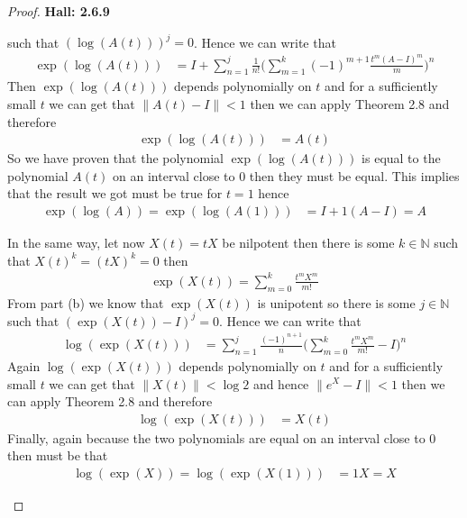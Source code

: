 \documentclass[11pt]{article}
\newcommand{\N}{\mathbb{N}}
\theoremstyle{definition}
\begin{document}
\begin{proof}{\textbf{Hall: 2.6.9}}
\begin{itemize}
such that $(\log(A(t)))^j = 0$. Hence we can write that
\begin{align*}
    \exp(\log(A(t)))
    &= I + \sum_{n=1}^j\frac{1}{n!}
    \bigg(\sum_{m=1}^k (-1)^{m+1}\frac{t^m(A - I)^m}{m}\bigg)^n
\end{align*}
Then $\exp(\log(A(t)))$ depends polynomially on $t$ and for a sufficiently
small $t$ we can get that $\|A(t) - I\| < 1$ then we can apply Theorem 2.8
and therefore
\begin{align*}
    \exp(\log(A(t))) &= A(t)
\end{align*}
So we have proven that the polynomial $\exp(\log(A(t)))$ is equal to the
polynomial $A(t)$ on an interval close to 0 then they must be equal. This
implies that the result we got must be true for $t=1$ hence
\begin{align*}
    \exp(\log(A)) = \exp(\log(A(1))) &= I + 1(A -I) = A
\end{align*}


In the same way, let now $X(t) = tX$ be nilpotent then there is some
$k \in \N$ such that $X(t)^k = (tX)^k = 0$ then 
\begin{align*}
    \exp(X(t)) = \sum_{m=0}^k \frac{t^mX^m}{m!}
\end{align*}
From part (b) we know that $\exp(X(t))$ is unipotent so there is some $j \in \N$
such that $(\exp(X(t)) - I)^j = 0$. Hence we can write that
\begin{align*}
    \log(\exp(X(t)))
    &= \sum_{n=1}^j\frac{(-1)^{n+1}}{n}
    \bigg(\sum_{m=0}^k \frac{t^mX^m}{m!} -I\bigg)^n
\end{align*}
Again $\log(\exp(X(t)))$ depends polynomially on $t$ and for a sufficiently
small $t$ we can get that $\|X(t)\| < \log 2$ and hence $\|e^X - I\| < 1$ then
we can apply Theorem 2.8 and therefore
\begin{align*}
    \log(\exp(X(t))) &= X(t)
\end{align*}
Finally, again because the two polynomials are equal on an interval close to
0 then must be that
\begin{align*}
    \log(\exp(X)) = \log(\exp(X(1))) &= 1X = X
\end{align*}

\end{itemize}
\end{proof}
\cleardoublepage
\end{document}
